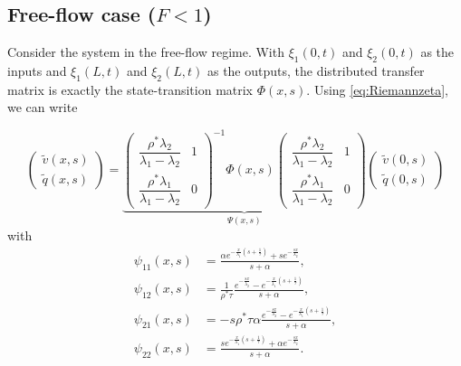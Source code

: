 \documentclass[5p,twocolumn]{elsarticle}
\begin{document}
\subsection{Free-flow case ($F<1$)}
Consider the system in the free-flow regime. With $\xi_1 (0,t)$ and $\xi_2 (0,t)$ as the inputs and $\xi_1(L,t)$ and $\xi_2(L,t)$ as the outputs, the distributed transfer matrix is exactly the state-transition matrix $\Phi(x,s)$. Using \eqref{eq:Riemannzeta}, we can write

\begin{equation} \label{vqfreeflow}
\begin{pmatrix}
\widetilde{v}(x,s) \\ \widetilde{q}(x,s)
\end{pmatrix} = \underbrace{ \begin{pmatrix}
\dfrac{\rho^*\lambda_2}{\lambda_1-\lambda_2} & 1\\
\dfrac{\rho^*\lambda_1}{\lambda_1-\lambda_2} & 0
\end{pmatrix}^{-1} \Phi(x,s) 
\begin{pmatrix}
\dfrac{\rho^*\lambda_2}{\lambda_1-\lambda_2} & 1\\
\dfrac{\rho^*\lambda_1}{\lambda_1-\lambda_2} & 0
\end{pmatrix} }_\text{$\Psi (x,s)$} \begin{pmatrix}
\widetilde{v}(0,s) \\ \widetilde{q}(0,s)
\end{pmatrix}
\end{equation}
with
\begin{subequations}
\label{psis}
\begin{align}
\psi_{11}(x,s) &= 
\frac{
	\alpha e^{-\frac{x}{\lambda_{1}}\left(s+\frac{1}{\tau}\right)}
		+ s e^{-\frac{sx}{\lambda_{2}}}
}{
	s + \alpha
}, \\
\psi_{12}(x,s) &=
\frac{1}{\rho^* \tau}
\frac{
	e^{-\frac{sx}{\lambda_{2}}}
	-
	e^{-\frac{x}{\lambda_{1}}\left(s+\frac{1}		{\tau}\right)}
}{
	s + \alpha
}, \\
\psi_{21}(x,s) &=
- s \rho^{*} \tau \alpha
\frac{
	e^{-\frac{sx}{\lambda_{2}}}
	-
	e^{-\frac{x}{\lambda_{1}}\left(s+\frac{1}		{\tau}\right)}
}{
	s + \alpha
}, \\
\psi_{22}(x,s) &=
\frac{
	s e^{-\frac{x}{\lambda_{1}}\left(s+\frac{1}{\tau}\right)}
		+ \alpha e^{-\frac{sx}{\lambda_{2}}}
}{
	s + \alpha
}.
\end{align}
\end{subequations}
\end{document}
